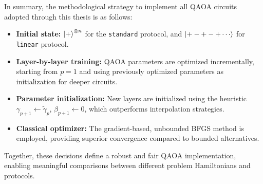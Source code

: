 
In summary, the methodological strategy to implement all QAOA circuits adopted through this thesis is as follows:
\begin{itemize}
    \item \textbf{Initial state:} $\ket{+}^{\otimes n}$ for the \texttt{standard} protocol, and $\ket{+-+-+\cdots}$ for \texttt{linear} protocol. 
    \item \textbf{Layer-by-layer training:} QAOA parameters are optimized incrementally, starting from $p=1$ and using previously optimized parameters as initialization for deeper circuits.  
    \item \textbf{Parameter initialization:} New layers are initialized using the heuristic $\gamma_{p+1} \leftarrow \widetilde{\gamma}_p$, $\beta_{p+1} \leftarrow 0$, which outperforms interpolation strategies.  
    \item \textbf{Classical optimizer:} The gradient-based, unbounded BFGS method is employed, providing superior convergence compared to bounded alternatives.  
\end{itemize}

Together, these decisions define a robust and fair QAOA implementation, enabling meaningful comparisons between different problem Hamiltonians and protocols.